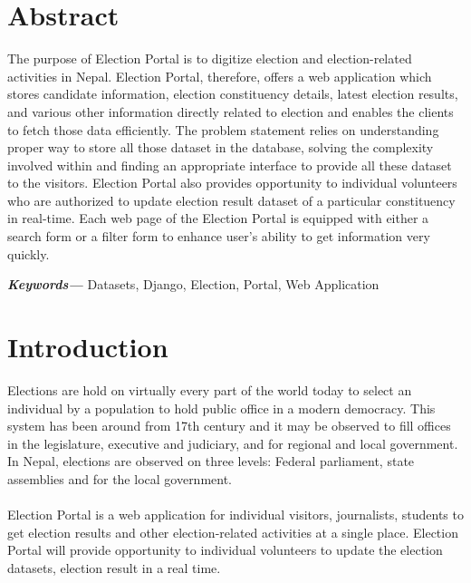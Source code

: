 \documentclass[12pt, a4paper, titlepage]{article}
\begin{document}
\section*{Abstract}
\thispagestyle{empty}
The purpose of Election Portal is to digitize election and election-related activities in Nepal. Election Portal, therefore, offers a web application which stores candidate information, election constituency details, latest election results, and various other information directly related to election and enables the clients to fetch those data efficiently. The problem statement relies on understanding proper way to store all those dataset in the database, solving the complexity involved within and finding an appropriate interface to provide all these dataset to the visitors. Election Portal also provides opportunity to individual volunteers who are authorized to update election result dataset of a particular constituency in real-time. Each web page of the Election Portal is equipped with either a search form or a filter form to enhance user's ability to get information very quickly.
\\
\providecommand{\keywords}[1]
{
  \small    
  \textbf{\textit{Keywords---}} #1
}

\hspace{10pt}
\keywords{Datasets, Django, Election, Portal, Web Application}

\newpage

\tableofcontents
\newpage


\section{Introduction}
Elections are hold on virtually every part of the world today to select an individual by a population to hold public office in a modern democracy. This system has been around from 17th century and it may be observed to fill offices in the legislature, executive and judiciary, and for regional and local government. In Nepal, elections are observed on three levels: Federal parliament, state assemblies and for the local government. \\ \\
Election Portal is a web application for individual visitors, journalists, students to get election results and other election-related activities at a single place. Election Portal will provide opportunity to individual volunteers to update the election datasets, election result in a real time.
\end{document}
